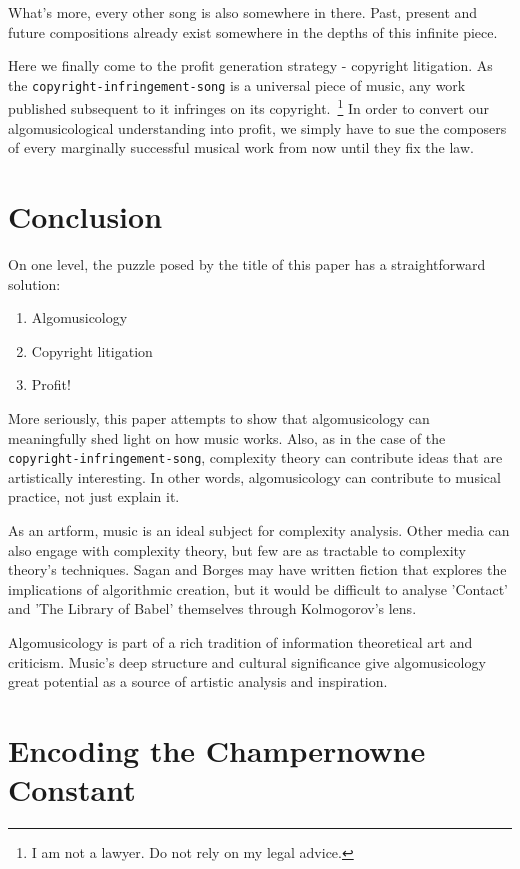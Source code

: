 \documentclass[numbers]{sigplanconf}
\begin{document}
What's more, every other song is also somewhere in there. Past, present and future compositions already exist somewhere in
the depths of this infinite piece.

Here we finally come to the profit generation strategy - copyright litigation. As the \verb|copyright-infringement-song| is
a universal piece of music, any work published subsequent to it infringes on its copyright.~\footnote{I am not a lawyer. Do not rely on my legal advice.} In order to convert our algomusicological understanding into profit, we simply have to sue the composers
of every marginally successful musical work from now until they fix the law.

\section{Conclusion}

On one level, the puzzle posed by the title of this paper has a straightforward solution:
\begin{enumerate}
    \item Algomusicology
    \item Copyright litigation
    \item Profit!
\end{enumerate}

More seriously, this paper attempts to show that algomusicology can meaningfully shed light on how music works. Also, as in
the case of the \verb|copyright-infringement-song|, complexity theory can contribute ideas that are artistically interesting.
In other words, algomusicology can contribute to musical practice, not just explain it.

As an artform, music is an ideal subject for complexity analysis. Other media can also engage with complexity theory, but
few are as tractable to complexity theory's techniques. Sagan and Borges may have written fiction that explores the implications
of algorithmic creation, but it would be difficult to analyse 'Contact' and 'The Library of Babel' themselves through
Kolmogorov's lens.

Algomusicology is part of a rich tradition of information theoretical art and criticism. Music's deep structure and cultural
significance give algomusicology great potential as a source of artistic analysis and inspiration.

\appendix
\section{Encoding the Champernowne Constant}
\end{document}
